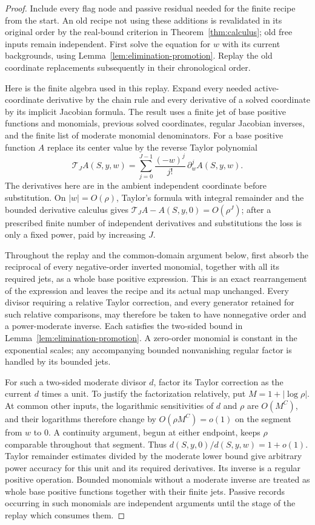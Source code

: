 \begin{proof}
Include every flag node and passive residual needed for the finite
recipe from the start.  An old recipe not using these additions is
revalidated in its original order by the real-bound criterion in
Theorem~\ref{thm:calculus}; old free inputs remain independent.  First
solve the equation for $w$ with its current backgrounds, using
Lemma~\ref{lem:elimination-promotion}.  Replay the old coordinate
replacements subsequently in their chronological order.

Here is the finite algebra used in this replay.  Expand every needed
active-coordinate derivative by the chain rule and every derivative
of a solved coordinate by its implicit Jacobian formula.  The result
uses a finite jet of base positive functions and monomials, previous
solved coordinates, regular Jacobian inverses, and the finite list of
moderate monomial denominators.  For a base positive function $A$
replace its center value by the reverse Taylor polynomial
\begin{equation}\label{eq:elimination-reverse-taylor}
 {\mathcal T}_J A(S,y,w)
   =\sum_{j=0}^{J-1}\frac{(-w)^j}{j!}\,
       \partial_w^j A(S,y,w).
\end{equation}
The derivatives here are in the ambient independent coordinate before
substitution.  On $|w|=O(\rho)$, Taylor's formula with integral remainder
and the bounded derivative calculus gives
${\mathcal T}_JA-A(S,y,0)=O(\rho^J)$; after a prescribed finite
number of independent derivatives and substitutions the loss is only
a fixed power, paid by increasing $J$.

Throughout the replay and the common-domain argument below, first
absorb the reciprocal of every negative-order inverted monomial,
together with all its required jets, as a whole base positive
expression.  This is an exact rearrangement of the expression and
leaves the recipe and its actual map unchanged.  Every divisor
requiring a relative Taylor correction, and every generator retained
for such relative comparisons, may therefore be taken to have
nonnegative order and a power-moderate inverse.  Each satisfies the
two-sided bound in Lemma~\ref{lem:elimination-promotion}.  A zero-order
monomial is constant in the exponential scales; any accompanying
bounded nonvanishing regular factor is handled by its bounded jets.

For such a two-sided moderate divisor $d$, factor its Taylor correction
as the current $d$ times a unit.  To justify the factorization relatively, put
$M=1+|\log\rho|$.  At common other inputs, the logarithmic
sensitivities of $d$ and $\rho$ are $O(M^C)$, and their logarithms
therefore change by $O(\rho M^C)=o(1)$ on the segment from $w$ to
$0$.  A continuity argument, begun at either endpoint, keeps $\rho$
comparable throughout that segment.  Thus
$d(S,y,0)/d(S,y,w)=1+o(1)$.  Taylor remainder estimates divided by
the moderate lower bound give arbitrary power accuracy for this unit
and its required derivatives.  Its inverse is a regular positive
operation.  Bounded monomials without a moderate inverse are treated
as whole base positive functions together with their finite jets.
Passive records occurring in such monomials are independent arguments
until the stage of the replay which consumes them.


\end{proof}
